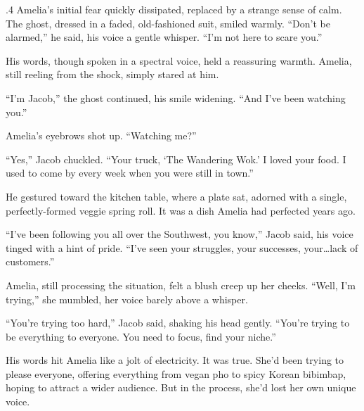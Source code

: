 \documentclass{article}
\newcommand{\baselinezs}{{\sc E2E$_{ZS}$}}
\begin{document}
\begin{tcolorbox}[colback=white, colframe=gray!30!white, coltitle=black, parskip=5mm, title=
    \textbf{System output: \baselinezs}, breakable]
\begin{spacing}{.4}
Amelia’s initial fear quickly dissipated, replaced by a strange sense of calm. The ghost, dressed in a faded, old-fashioned suit, smiled warmly. “Don’t be alarmed,” he said, his voice a gentle whisper. “I’m not here to scare you.”  \\\par

His words, though spoken in a spectral voice, held a reassuring warmth. Amelia, still reeling from the shock, simply stared at him. \\\par

“I’m Jacob,” the ghost continued, his smile widening. “And I’ve been watching you.” \\\par

Amelia’s eyebrows shot up. “Watching me?” \\\par

“Yes,” Jacob chuckled. “Your truck, ‘The Wandering Wok.’ I loved your food. I used to come by every week when you were still in town.” \\\par

He gestured toward the kitchen table, where a plate sat, adorned with a single, perfectly-formed veggie spring roll. It was a dish Amelia had perfected years ago. \\\par

“I’ve been following you all over the Southwest, you know,” Jacob said, his voice tinged with a hint of pride. “I’ve seen your struggles, your successes, your…lack of customers.” \\\par

Amelia, still processing the situation, felt a blush creep up her cheeks. “Well, I’m trying,” she mumbled, her voice barely above a whisper. \\\par

“You’re trying too hard,” Jacob said, shaking his head gently. “You’re trying to be everything to everyone. You need to focus, find your niche.” \\\par

His words hit Amelia like a jolt of electricity. It was true. She’d been trying to please everyone, offering everything from vegan pho to spicy Korean bibimbap, hoping to attract a wider audience. But in the process, she’d lost her own unique voice. \\\par


\end{spacing}
\end{tcolorbox}
\end{document}
